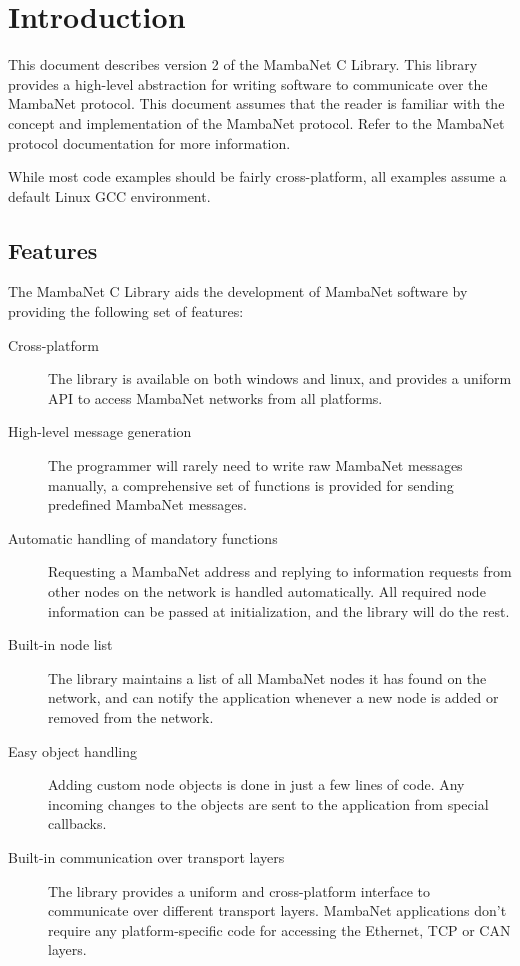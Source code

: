 \chapter{Introduction}
This document describes version 2 of the MambaNet C Library. This library provides a high-level abstraction for writing software to communicate over the MambaNet protocol. This document assumes that the reader is familiar with the concept and implementation of the MambaNet protocol. Refer to the MambaNet protocol documentation for more information.

While most code examples should be fairly cross-platform, all examples assume a default Linux GCC environment.


\section{Features}
The MambaNet C Library aids the development of MambaNet software by providing the following set of features:
\begin{description}
 \item[Cross-platform]
  The library is available on both windows and linux, and provides a uniform API to access MambaNet networks from all platforms.
 \item[High-level message generation]
  The programmer will rarely need to write raw MambaNet messages manually, a comprehensive set of functions is provided for sending predefined MambaNet messages.
 \item[Automatic handling of mandatory functions]
  Requesting a MambaNet address and replying to information requests from other nodes on the network is handled automatically. All required node information can be passed at initialization, and the library will do the rest.
 \item[Built-in node list]
  The library maintains a list of all MambaNet nodes it has found on the network, and can notify the application whenever a new node is added or removed from the network.
 \item[Easy object handling]
  Adding custom node objects is done in just a few lines of code. Any incoming changes to the objects are sent to the application from special callbacks.
 \item[Built-in communication over transport layers]
  The library provides a uniform and cross-platform interface to communicate over different transport layers. MambaNet applications don't require any platform-specific code for accessing the Ethernet, TCP or CAN layers.
\end{description}


